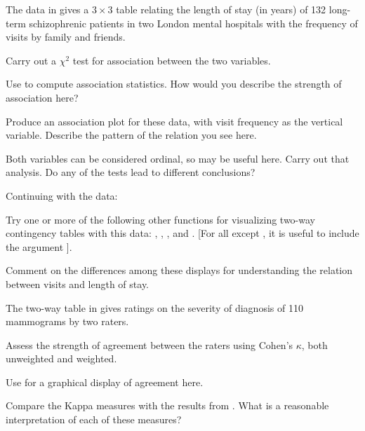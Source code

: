 \documentclass[10pt,krantz2]{krantz}\usepackage[]{graphicx}\usepackage[]{color}
\begin{document}
\begin{Exercises}
  \exercise The  data in  gives a $3 \times 3$ table
  relating the length of stay (in years) of 132 long-term schizophrenic patients in two London mental hospitals with the frequency of visits
  by family and friends.
    \begin{enumerate*}
      \item Carry out a  $\chi^2$ test for association between the two
      variables.
      \item Use  to compute association statistics.
      How would you describe the strength of association here?
      \item Produce an association plot for these data, with
      visit frequency as the vertical variable.  Describe the
      pattern of the relation you see here.
      \item Both variables can be considered ordinal, so
       may be useful here.  Carry out that
      analysis.  Do any of the tests lead to different conclusions?
    \end{enumerate*}

  \exercise Continuing with the  data:
    \begin{enumerate*}
      \item Try one or more of the following other functions for visualizing two-way contingency tables with this data: 
      , , , and .  
      [For all except , it is useful to include the argument ].
      \item Comment on the differences among these displays for understanding the relation between visits and length of stay.
    \end{enumerate*}
  
  \exercise The two-way table  in  gives ratings
  on the severity of diagnosis of 110 mammograms by two raters.
    \begin{enumerate*}
      \item Assess the strength of agreement between the raters using Cohen's
      $\kappa$, both unweighted and weighted.
      \item Use  for a graphical display of agreement here.
      \item Compare the Kappa measures with the results from . 
      What is a reasonable interpretation of each of these measures?
    \end{enumerate*}


\end{Exercises}
\end{document}
